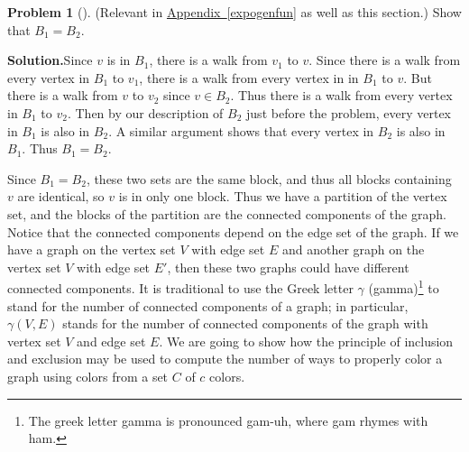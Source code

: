 \documentclass[10pt,]{book}
\theoremstyle{plain}
\theoremstyle{definition}
\newtheorem{activity}[project]{Problem}
\theoremstyle{definition}
\numberwithin{equation}{chapter}
\begin{document}
\begin{activity}[]\label{conncomp}
(Relevant in \hyperref[expogenfun]{Appendix~\ref{expogenfun}} as well as this section.) Show that \(B_1=B_2\).%
\par\medskip\noindent%
\textbf{Solution.}\quad Since \(v\) is in \(B_1\), there is a walk from \(v_1\) to \(v\). Since there is a walk from every vertex in \(B_1\) to \(v_1\), there is a walk from every vertex in in \(B_1\) to \(v\). But there is a walk from \(v\) to \(v_2\) since \(v\in B_2\). Thus there is a walk from every vertex in \(B_1\) to \(v_2\). Then by our description of \(B_2\) just before the problem, every vertex in \(B_1\) is also in \(B_2\). A similar argument shows that every vertex in \(B_2\) is also in \(B_1\). Thus \(B_1=B_2\).%
\end{activity}
Since \(B_1=B_2\), these two sets are the same block, and thus all blocks containing \(v\) are identical, so \(v\) is in only one block. Thus we have a partition of the vertex set, and the blocks of the partition are the connected components of the graph. Notice that the connected components depend on the edge set of the graph. If we have a graph on the vertex set \(V\) with edge set \(E\) and another graph on the vertex set \(V\) with edge set \(E'\), then these two graphs could have different connected components. It is traditional to use the Greek letter \(\gamma\) (gamma)\footnote{The greek  letter gamma is pronounced gam-uh, where gam rhymes with ham.\label{fn-18}} to stand for the number of connected components of a graph; in particular, \(\gamma(V,E)\) stands for the number of connected components of the graph with vertex set \(V\) and edge set \(E\). We are going to show how the principle of inclusion and exclusion may be used to compute the number of ways to properly color a graph using colors from a set \(C\) of \(c\) colors.%
\end{document}

